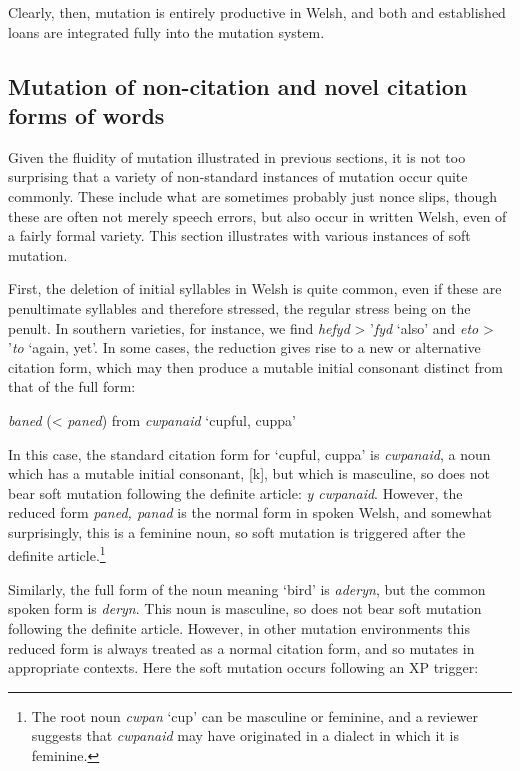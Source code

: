 \documentclass[output=paper,colorlinks,citecolor=brown]{langscibook}
\begin{document}
Clearly, then, mutation is entirely productive in Welsh, and both  and established loans are integrated fully into the mutation system. 
\subsection{Mutation of non-citation and novel citation forms of words}

Given the fluidity of mutation illustrated in previous sections, it is not too surprising that a variety of non-standard instances of mutation occur quite commonly. These include what are sometimes probably just nonce slips, though these are often not merely speech errors, but also occur in written Welsh, even of a fairly formal variety. This section illustrates with various instances of soft mutation.

{First, the deletion of initial syllables in Welsh is quite common, even if these are penultimate syllables and therefore stressed, the regular stress being on the penult. In southern varieties, for instance, we find} {\textit{hefyd} }{> ’}{\textit{fyd}}{ ‘also’ and} {\textit{eto} }{> ’}{\textit{to}}{ ‘again, yet’. In some cases, the reduction gives rise to a new or alternative citation form, which may then produce a mutable initial consonant distinct from that of the full form:}

\ea\label{ex:mt:tallerman:44}
\textit{baned} (< \textit{paned}) {from \textit{cwpanaid} ‘cupful, cuppa’}
\z

{In this case, the standard citation form for ‘cupful, cuppa’ is} {\textit{cwpanaid}}{, a noun which has a mutable initial consonant, [k], but which is masculine, so does not bear soft mutation following the definite article:} {\textit{y cwpanaid}}{. However, the reduced form} {\textit{paned, panad}}{ is the normal form in spoken Welsh, and somewhat surprisingly, this is a feminine noun,} so soft mutation is triggered after the definite article.\footnote{{The root noun} {\textit{cwpan}}{ ‘cup’ can be masculine or feminine, and a reviewer suggests that} \textit{cwpanaid} {may have originated in a dialect in which it is feminine.}}

Similarly, the full form of the noun meaning ‘bird’ is {\textit{aderyn}}{, but the common spoken form is} {\textit{deryn}}. This noun is masculine, so does not bear soft mutation following the definite article. However, in other mutation environments this reduced form is always treated as a normal citation form, and so mutates in appropriate contexts. Here the soft mutation occurs following an XP trigger:
\end{document}

